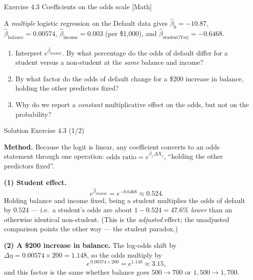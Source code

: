 \documentclass[aspectratio=169,11pt]{beamer}
\begin{document}
\begin{frame}{Exercise 4.3 \textemdash{} Coefficients on the odds scale [Math]}
\begin{exercise}
A \emph{multiple} logistic regression on the Default data gives
$\hat\beta_0=-10.87$, $\hat\beta_{\text{balance}}=0.00574$,
$\hat\beta_{\text{income}}=0.003$ (per \$1{,}000), and
$\hat\beta_{\text{student[Yes]}}=-0.6468$.
\begin{enumerate}
  \item Interpret $e^{\hat\beta_{\text{student}}}$. By what percentage
        do the odds of default differ for a student versus a non-student
        at the \emph{same} balance and income?
  \item By what factor do the odds of default change for a \$200 increase
        in balance, holding the other predictors fixed?
  \item Why do we report a \emph{constant} multiplicative effect on the
        odds, but not on the probability?
\end{enumerate}
\end{exercise}
\end{frame}

\begin{frame}{Solution \textemdash{} Exercise 4.3 (1/2)}
\begin{solutionbox}
\textbf{Method.} Because the logit is linear, any coefficient converts
to an odds statement through one operation:
$\text{odds ratio} = e^{\beta_j\,\Delta X_j}$, ``holding the other
predictors fixed''.

\vspace{1mm}
\textbf{(1) Student effect.}
\[
  e^{\hat\beta_{\text{student}}} = e^{-0.6468} \approx 0.524 .
\]
Holding balance and income fixed, being a student multiplies the odds
of default by $0.524$ --- i.e.\ a student's odds are about
$1-0.524 = 47.6\%$ \emph{lower} than an otherwise identical
non-student. (This is the \emph{adjusted} effect; the unadjusted
comparison points the other way --- the student paradox.)

\vspace{1mm}
\textbf{(2) A \$200 increase in balance.} The log-odds shift by
$\Delta\eta = 0.00574 \times 200 = 1.148$, so the odds multiply by
\[
  e^{\,0.00574 \times 200} = e^{1.148} \approx 3.15 ,
\]
and this factor is the same whether balance goes
$500\to700$ or $1{,}500\to1{,}700$.
\end{solutionbox}
\end{frame}
\end{document}
